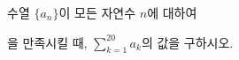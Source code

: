\hspace*{2mm}\begin{minipage}[t]{\dimexpr\linewidth-2mm\relax}\vspace{0pt}
수열 $\{a_n\}$이 모든 자연수 $n$에 대하여 \par\smallskip{}\par\smallskip\noindent 을 만족시킬 때, $\displaystyle\sum_{k=1}^{20}a_k$의 값을 구하시오.\end{minipage}
